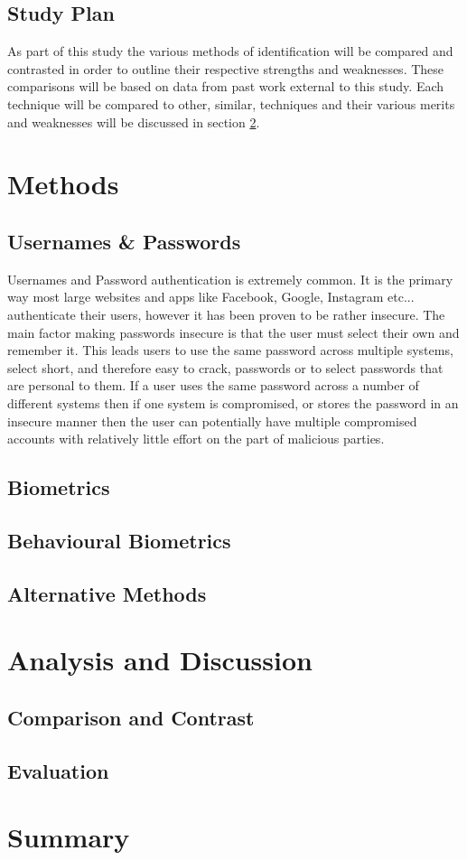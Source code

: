 \documentclass[12pt]{article}
\begin{document}
	\subsection{Study Plan}
	As part of this study the various methods of identification will be compared and contrasted in order to outline their respective strengths and weaknesses. These comparisons will be based on data from past work external to this study.
	Each technique will be compared to other, similar, techniques and their various merits and weaknesses will be discussed in section \ref{sect_analysis}.
	
	\section{Methods}
	\label{sect_methods}
	\subsection{Usernames \& Passwords}
	Usernames and Password authentication is extremely common. It is the primary way most large websites and apps like Facebook, Google, Instagram etc... authenticate their users, however it has been proven to be rather insecure. The main factor making passwords insecure is that the user must select their own and remember it. This leads users to use the same password across multiple systems, select short, and therefore easy to crack, passwords or to select passwords that are personal to them.
	If a user uses the same password across a number of different systems then if one system is compromised, or stores the password in an insecure manner then the user can potentially have multiple compromised accounts with relatively little effort on the part of malicious parties.
	
	\subsection{Biometrics}
	\label{subsect_biometrics}
	\subsection{Behavioural Biometrics}
	\label{subsect_behavioral_biometrics}
	\subsection{Alternative Methods}
	
	
	\section{Analysis and Discussion}
	\label{sect_analysis}
	
	\subsection{Comparison and Contrast}
	
	
	\subsection{Evaluation}
	
	\section{Summary}
	
	
	 
	
\end{document}

